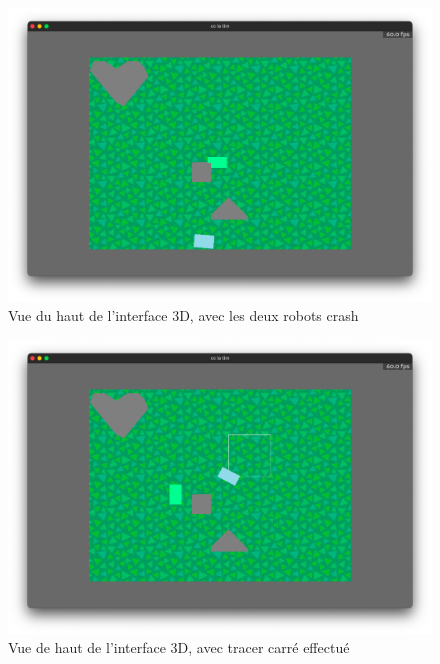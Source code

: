 \documentclass[12pt]{article}
\begin{document}
\begin{center}
\begin{figure}[h]
    \centering
    \includegraphics[width=1\linewidth]{image7.png}
    \caption{Vue du haut de l’interface 3D, avec les deux robots crash}
    \label{fig:enter-label}
\end{figure}



\begin{figure}[p]
    \centering
    \includegraphics[width=1\linewidth]{image4.png}
    \caption{Vue de haut de l’interface 3D, avec tracer carré effectué}
    \label{fig:enter-label}
\end{figure}



\end{center}
\end{document}
